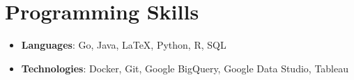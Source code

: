 \documentclass[letterpaper,11pt]{article}
\newcommand{\resumeItem}[2]{
  \item\small{
    \textbf{#1}{: #2 \vspace{-2pt}}
  }
}
\newcommand{\resumeSubItem}[2]{\resumeItem{#1}{#2}\vspace{-4pt}}
\newcommand{\resumeSubHeadingListStart}{\begin{itemize}[leftmargin=*]}
\newcommand{\resumeSubHeadingListEnd}{\end{itemize}}
\begin{document}


\section{Programming Skills}
  \resumeSubHeadingListStart
    \resumeSubItem{Languages}{Go, Java, LaTeX, Python, R, SQL}
    \resumeSubItem{Technologies}{Docker, Git, Google BigQuery, Google Data Studio, Tableau}
  \resumeSubHeadingListEnd

\end{document}
